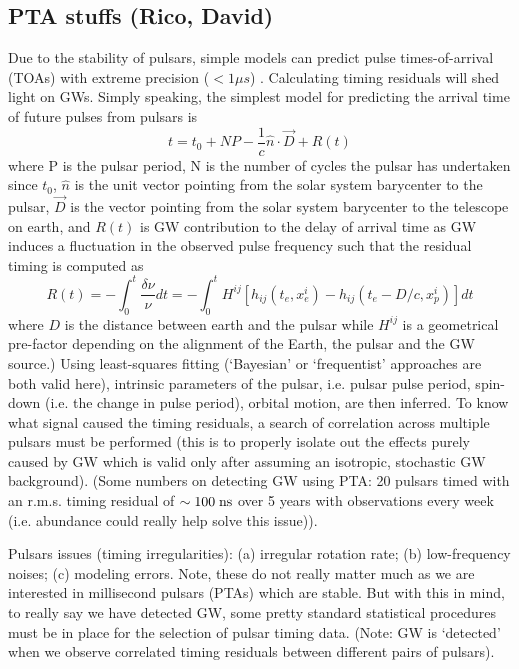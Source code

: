 \documentclass{article}
\begin{document}
\subsection{PTA stuffs (Rico, David)}
Due to the stability of pulsars, simple models can predict pulse times-of-arrival (TOAs) with extreme precision ($<1 \mu s$) \cite{Hobbs2010}. Calculating timing residuals will shed light on GWs. Simply speaking, the simplest model for predicting the arrival time of future pulses from pulsars is 
\begin{equation}
    t=t_0+NP-\frac{1}{c}\hat{n}\cdot{\vec{D}}+R(t)
\end{equation}
where P is the pulsar period, N is the number of cycles the pulsar has undertaken since $t_0$, $\hat{n}$ is the unit vector pointing from the solar system barycenter to the pulsar, $\vec{D}$ is the vector pointing from the solar system barycenter to the telescope on earth, and $R(t)$ is GW contribution to the delay of arrival time as GW induces a fluctuation in the observed pulse frequency such that the residual timing is computed as
\begin{equation}
    R(t)=-\int_0^t\frac{\delta \nu}{\nu}dt=-\int_0^tH^{ij}\left[h_{ij}(t_e,x_e^i)-h_{ij}(t_e-D/c,x_p^i)\right]dt
\end{equation}
where $D$ is the distance between earth and the pulsar while $H^{ij}$ is a geometrical pre-factor depending on the alignment of the Earth, the pulsar and the GW source.) Using least-squares fitting (`Bayesian' or `frequentist' approaches are both valid here), intrinsic parameters of the pulsar, i.e. pulsar pulse period, spin-down (i.e. the change in pulse period), orbital motion, are then inferred. To know what signal caused the timing residuals, a search of correlation across multiple pulsars must be performed (this is to properly isolate out the effects purely caused by GW which is valid only after assuming an isotropic, stochastic GW background). (Some numbers on detecting GW using PTA: 20 pulsars timed with an r.m.s. timing residual of $\sim 100 \; {\rm ns}$ over 5 years with observations every week (i.e. abundance could really help solve this issue)).

Pulsars issues (timing irregularities): (a) irregular rotation rate; (b) low-frequency noises; (c) modeling errors. Note, these do not really matter much as we are interested in millisecond pulsars (PTAs) which are stable. But with this in mind, to really say we have detected GW, some pretty standard statistical procedures must be in place for the selection of pulsar timing data. (Note: GW is `detected' when we observe correlated timing residuals between different pairs of pulsars).
\end{document}
